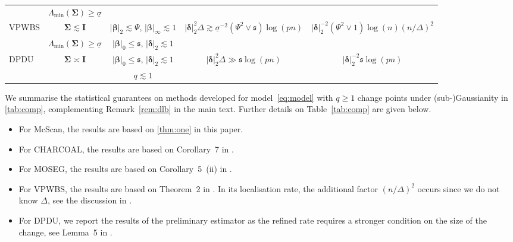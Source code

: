 \documentclass[11pt, a4paper]{article}
\newcommand{\mbf}{\mathbf}
\theoremstyle{definition}
\theoremstyle{definition}
\theoremstyle{definition}
\theoremstyle{definition}
\theoremstyle{definition}
\theoremstyle{remark}
\theoremstyle{definition}
\theoremstyle{definition}
\theoremstyle{definition}
\begin{document}
\begin{table}[!h!t!b]
{\begin{tabular}{l cc c c}
& $\Lambda_{\min}(\bm\Sigma) \ge \underline{\sigma}$ &&& \\ 

\cmidrule(lr){1-1} \cmidrule(lr){2-3} \cmidrule(lr){4-5}


\multirow{2}{*}{VPWBS}& $\bm\Sigma \lesssim \mbf I$ & $\vert \bm\beta \vert_2 \lesssim \Psi$, $\vert \bm\beta \vert_{\infty} \lesssim 1$ & \multirow{2}{*}{$\vert \bm\delta \vert_2^2 \Delta \gtrsim \underline{\sigma}^{-2}(\Psi^2 \vee \mathfrak{s}) \log(pn)$} & \multirow{2}{*}{$\vert \bm\delta \vert_2^{-2} (\Psi^2 \vee 1) \log(n)  (n/\Delta)^2$} \\  

& $\Lambda_{\min}(\bm\Sigma) \ge \underline{\sigma}$ &  $\vert \bm\beta \vert_0 \le \mathfrak{s}$, {$\vert \bm\delta \vert_2 \lesssim 1$} & & \\

\cmidrule(lr){1-1} \cmidrule(lr){2-3} \cmidrule(lr){4-5}

\multirow{2}{*}{DPDU} 
& \multirow{2}{*}{$\bm\Sigma \asymp \mbf I$} & $\vert \bm\beta \vert_0 \le \mathfrak{s}$, $\vert \bm\delta \vert_2 \lesssim 1$ & \multirow{2}{*}{$\vert \bm\delta \vert_2^2 \Delta \gg \mathfrak{s} \log(pn)$} & \multirow{2}{*}{$\vert \bm\delta \vert_2^{-2} \mathfrak{s} \log(pn)$} \\
& & $q \lesssim 1$  & & \\
\bottomrule
\end{tabular}}
\end{table}

We summarise the statistical guarantees on methods developed for model~\eqref{eq:model} with $q\ge 1$ change points under (sub-)Gaussianity in \cref{tab:comp}, complementing Remark~\ref{rem:dlb} in the main text. 
Further details on Table~\ref{tab:comp} are given below. 
\begin{itemize}
    \item For McScan, the results are based on \cref{thm:one} in this paper. 
    \item 
    For CHARCOAL, the results are based on Corollary~7 in \citet{gao2022sparse}.
    \item 
    For MOSEG, the results are based on Corollary~5~(ii) in \citet{cho2022high}.
    \item 
    For VPWBS, the results are based on Theorem~2 in \citet{wang2021statistically}. In its localisation rate, the additional factor {$(n/\Delta)^2$} occurs since we do not know $\Delta$, see the discussion in \citet[bottom of page~12]{wang2021statistically}.
    \item 
    For DPDU, we report the results of the preliminary estimator as the refined rate requires a stronger condition on the size of the change, see Lemma~5 in \citet{xu2022change}.
\end{itemize}
\end{document}
